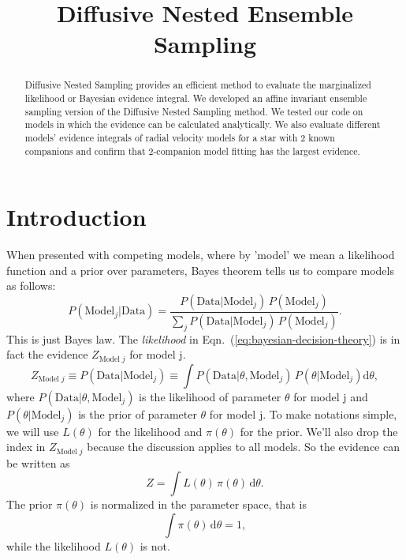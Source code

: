\documentclass[letterpaper, preprint]{aastex}
\begin{document}
\title{
  Diffusive Nested Ensemble Sampling
}

\begin{abstract}
Diffusive Nested Sampling provides an efficient method to evaluate the marginalized likelihood or Bayesian evidence integral. We developed an affine invariant ensemble sampling version of the Diffusive Nested Sampling method. We tested our code on models in which the evidence can be calculated analytically. We also evaluate different models' evidence integrals of radial velocity models for a star with 2 known companions and confirm that 2-companion model fitting has the largest evidence.

\end{abstract}


\section{Introduction}

When presented with competing models, where by 'model' we mean a likelihood function and a prior over parameters, Bayes theorem tells us to compare models as follows:
\begin{equation}
P(\mathrm{Model}_j|\mathrm{Data})=\frac{P(\mathrm{Data}|\mathrm{Model}_j)\,P(\mathrm{Model}_j)}{\sum_j{P(\mathrm{Data}|\mathrm{Model}_j)\,P(\mathrm{Model}_j)}}.
\label{eq:bayesian-decision-theory}
\end{equation}
This is just Bayes law. The \textit{likelihood} in Eqn.~(\ref{eq:bayesian-decision-theory}) is in fact the evidence $Z_{\mathrm{Model}\;j}$ for model j.
\begin{equation}
Z_{\mathrm{Model}\;j} \equiv P(\mathrm{Data}|\mathrm{Model}_j) \equiv \int P(\mathrm{Data}|\theta, \mathrm{Model}_j) \, P(\theta|\mathrm{Model}_j)\mathrm{d}\theta,
\end{equation}
where $P(\mathrm{Data}|\theta, \mathrm{Model}_j)$ is the likelihood of parameter $\theta$ for model j and $P(\theta|\mathrm{Model}_j)$ is the prior of parameter $\theta$ for model j. To make notations simple, we will use $L(\theta)$ for the likelihood and $\pi(\theta)$ for the prior. We'll also drop the index in $Z_{\mathrm{Model}\;j}$ because the discussion applies to all models. So the evidence can be written as
\begin{equation}
Z=\int\! L(\theta)\,\pi(\theta)\,\mathrm{d}\theta.
\end{equation}
The prior $\pi(\theta)$ is normalized in the parameter space, that is
\begin{equation}
\int\!\pi(\theta)\,\mathrm{d}\theta=1,
\end{equation}
while the likelihood $L(\theta)$ is not.
\end{document}
